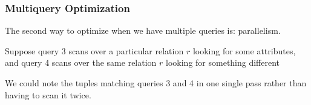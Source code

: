 \begin{frame}
\frametitle{Multiquery Optimization}

The second way to optimize when we have multiple queries is: parallelism.

Suppose query 3 scans over a particular relation $r$ looking for some attributes, and query 4 scans over the same relation $r$ looking for something different

We could note the tuples matching queries 3 and 4 in one single pass rather than having to scan it twice.



\end{frame}






